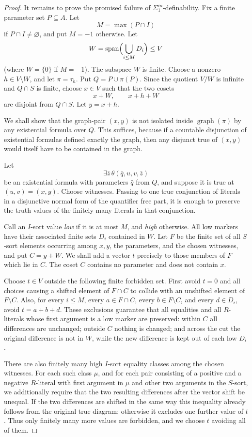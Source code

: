 \documentclass[12pt]{article}
\newcommand{\spanv}{\operatorname{span}}
\begin{document}
\begin{proof}
It remains to prove the promised failure of $\Sigma^{in}_1$-definability.
Fix a finite parameter set $P\subseteq A$.  Let
\[
        M=\max(P\cap I)
\]
if $P\cap I\neq\varnothing$, and put $M=-1$ otherwise.  Let
\[
        W=\spanv\Bigl(\bigcup_{i\le M}D_i\Bigr)\le V
\]
(where $W=\{0\}$ if $M=-1$).  The subspace $W$ is finite.  Choose a
nonzero $h\in V\setminus W$, and let $\pi=\tau_h$.  Put
$Q=P\cup\pi(P)$.  Since the quotient $V/W$ is infinite and $Q\cap S$ is
finite, choose $x\in V$ such that the two cosets
\[
        x+W,\qquad x+h+W
\]
are disjoint from $Q\cap S$.  Let $y=x+h$.

We shall show that the graph-pair $(x,y)$ is not isolated inside
$\operatorname{graph}(\pi)$ by any existential formula over $Q$.  This
suffices, because if a countable disjunction of existential formulas
defined exactly the graph, then any disjunct true of $(x,y)$ would itself
have to be contained in the graph.

Let
\[
        \exists \bar z\,\theta(\bar q,u,v,\bar z)
\]
be an existential formula with parameters $\bar q$ from $Q$, and suppose
it is true at $(u,v)=(x,y)$.  Choose witnesses.  Passing to one true
conjunction of literals in a disjunctive normal form of the quantifier
free part, it is enough to preserve the truth values of the finitely many
literals in that conjunction.

Call an $I$-sort value \emph{low} if it is at most $M$, and
\emph{high} otherwise.  All low markers have their associated finite
sets $D_i$ contained in $W$.  Let $F$ be the finite set of all $S$-sort
elements occurring among $x,y$, the parameters, and the chosen witnesses,
and put $C=y+W$.  We shall add a vector $t$ precisely to those members of
$F$ which lie in $C$.  The coset $C$ contains no parameter and does not
contain $x$.

Choose $t\in V$ outside the following finite forbidden set.  First avoid
$t=0$ and all choices causing a shifted element of $F\cap C$ to collide
with an unshifted element of $F\setminus C$.  Also, for every
$i\le M$, every $a\in F\cap C$, every $b\in F\setminus C$, and every
$d\in D_i$, avoid $t=a+b+d$.  These exclusions guarantee that all
equalities and all $R$-literals whose first argument is a low marker are
preserved: within $C$ all differences are unchanged; outside $C$ nothing
is changed; and across the cut the original difference is not in $W$,
while the new difference is kept out of each low $D_i$.

There are also finitely many high $I$-sort equality classes among the
chosen witnesses.  For each such class $\mu$, and for each pair
consisting of a positive and a negative $R$-literal with first argument
in $\mu$ and other two arguments in the $S$-sort, we additionally require
that the two resulting differences after the vector shift be unequal.
If the two differences are shifted in the same way this inequality
already follows from the original true diagram; otherwise it excludes
one further value of $t$.  Thus only finitely many more values are
forbidden, and we choose $t$ avoiding all of them.


\end{proof}
\end{document}
